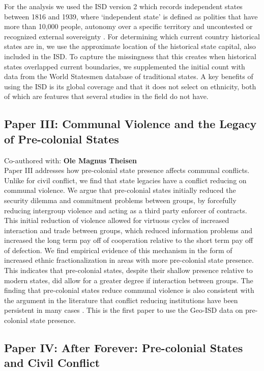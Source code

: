 For the analysis we used the ISD version 2 which records independent states
between 1816 and 1939, where `independent state' is defined as polities that
have more than 10,000 people, autonomy over a specific territory and uncontested
or recognized external sovereignty \citep{Butcher2020}. For determining which
current country historical states are in, we use the approximate location of the
historical state capital, also included in the ISD. To capture the missingness
that this creates when historical states overlapped current boundaries, we
supplemented the initial count with data from the World Statesmen database of
traditional states. A key benefits of using the ISD is its global coverage and
that it does not select on ethnicity, both of which are features that several
studies in the field do not have. 

\subsection{Paper III: Communal Violence and the Legacy of Pre-colonial States}
\label{Paper 3}

Co-authored with: \textbf{Ole Magnus Theisen}\\

Paper III addresses how pre-colonial state presence affects communal conflicts.
Unlike for civil conflict, we find that state legacies have a conflict reducing
on communal violence. We argue that pre-colonial states initially reduced the
security dilemma and commitment problems between groups, by forcefully reducing
intergroup violence and acting as a third party enforcer of contracts. This
initial reduction of violence allowed for virtuous cycles of increased
interaction and trade between groups, which reduced information problems and
increased the long term pay off of cooperation relative to the short term pay
off of defection. We find empirical evidence of this mechanism in the form of
increased ethnic fractionalization in areas with more pre-colonial state
presence. This indicates that pre-colonial states, despite their shallow
presence relative to modern states, did allow for a greater degree if
interaction between groups. The finding that pre-colonial states reduce communal
violence is also consistent with the argument in the literature that conflict
reducing institutions have been persistent in many cases \citep{Wig2018}. This
is the first paper to use the Geo-ISD data on pre-colonial state presence.

\subsection{Paper IV: After Forever: Pre-colonial States and Civil Conflict}
\label{Paper 4}

